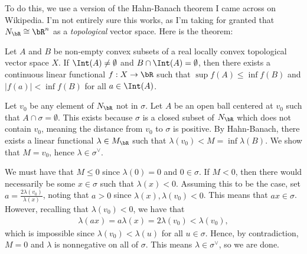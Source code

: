 \begin{homework}[e]
\begin{prf}
		To do this, we use a version of the Hahn-Banach theorem I came across on Wikipedia. I'm not entirely sure this works, as I'm taking for granted that $N_\bR \cong \bR^n$ as a \emph{topological} vector space. Here is the theorem:
		\begin{thm}\label{thm:Hahn-Banach}
			Let $A$ and $B$ be non-empty convex subsets of a real locally convex topological vector space $X$. If $\Int(A) \neq \emptyset$ and $B \cap \Int(A) = \emptyset$, then there exists a continuous linear functional $f:X\to \bR$ such that $\sup f(A) \leq \inf f(B)$ and $|f(a)| < \inf f(B)$ for all $a \in \Int(A)$. 
		\end{thm}
		
		Let $v_0$ be any element of $N_\bR$ not in $\sigma$. Let $A$ be an open ball centered at $v_0$ such that $A \cap \sigma = \emptyset$. This exists because $\sigma$ is a closed subset of $N_\bR$ which does not contain $v_0$, meaning the distance from $v_0$ to $\sigma$ is positive. By Hahn-Banach, there exists a linear functional $\lambda \in M_\bR$ such that $\lambda(v_0) < M = \inf \lambda(B)$. We show that $M = v_0$, hence $\lambda \in \sigma^{\vee}$.

		We must have that $M \leq 0$ since $\lambda(0) = 0$ and $0 \in \sigma$. If $M < 0$, then there would necessarily be some $x \in \sigma$ such that $\lambda(x) < 0$. Assuming this to be the case, set $a = \frac{2\lambda(v_0)}{\lambda(x)}$, noting that $a > 0$ since $\lambda(x), \lambda(v_0) < 0$. This means that $a x \in \sigma$. However, recalling that $\lambda(v_0) < 0$, we have that
		\begin{align*}
			\lambda(ax) = a\lambda(x) = 2\lambda(v_0) < \lambda(v_0),
		\end{align*}
		which is impossible since $\lambda(v_0) < \lambda(u)$ for all $u \in \sigma$. Hence, by contradiction, $M = 0$ and $\lambda$ is nonnegative on all of $\sigma$. This means $\lambda \in \sigma^{\vee}$, so we are done.

		\bigskip


\end{prf}
\end{homework}
